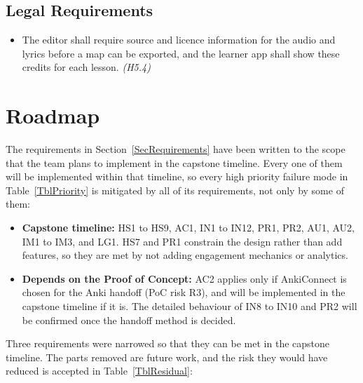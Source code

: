 \documentclass{article}
\begin{document}
\subsection{Legal Requirements}

\begin{itemize}
  \item[LG1.] The editor shall require source and licence information for the
        audio and lyrics before a map can be exported, and the learner app
        shall show these credits for each lesson. \emph{(H5.4)}
\end{itemize}

\section{Roadmap} \label{SecRoadmap}

The requirements in Section~\ref{SecRequirements} have been written to the
scope that the team plans to implement in the capstone timeline. Every one of
them will be implemented within that timeline, so every high priority failure
mode in Table~\ref{TblPriority} is mitigated by all of its requirements, not
only by some of them:

\begin{itemize}
  \item \textbf{Capstone timeline:} HS1 to HS9, AC1, IN1 to IN12, PR1, PR2,
        AU1, AU2, IM1 to IM3, and LG1. HS7 and PR1 constrain the design rather
        than add features, so they are met by not adding engagement mechanics
        or analytics.
  \item \textbf{Depends on the Proof of Concept:} AC2 applies only if
        AnkiConnect is chosen for the Anki handoff (PoC risk R3), and will be
        implemented in the capstone timeline if it is. The detailed behaviour
        of IN8 to IN10 and PR2 will be confirmed once the handoff method is
        decided.
\end{itemize}

Three requirements were narrowed so that they can be met in the capstone
timeline. The parts removed are future work, and the risk they would have
reduced is accepted in Table~\ref{TblResidual}:
\end{document}
